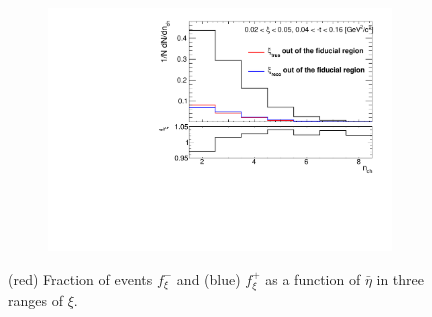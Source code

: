 \begin{figure}[h!]
\begin{subfigure}{.49\textwidth}
		\includegraphics[width=\textwidth,page=9]{chapters/chrgSTAR/img/xiMigration/xi.pdf}
	\end{subfigure}
	\begin{minipage}{.49\textwidth}
		\caption{(red) Fraction of events $f_{\xi}^-$ and (blue) $f_{\xi}^+$  as a function of $\bar{\eta}$ in three ranges of $\xi$.}
		\label{fig:xi_correction_eta}
	\end{minipage}
	\vspace{-2.5cm}
	
\end{figure}